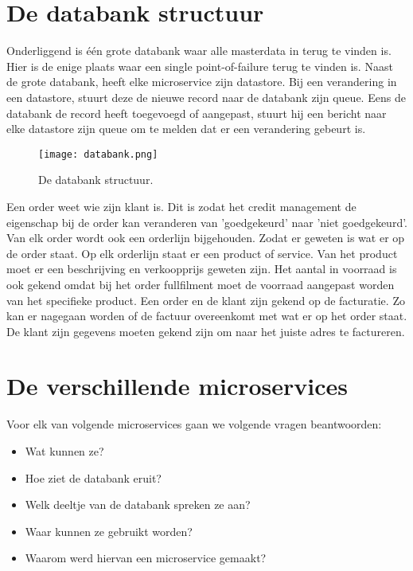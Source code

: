 \section{De databank structuur}
Onderliggend is één grote databank waar alle masterdata in terug te vinden is. Hier is de enige plaats waar een single point-of-failure terug te vinden is. Naast de grote databank, heeft elke microservice zijn datastore. Bij een verandering in een datastore, stuurt deze de nieuwe record naar de databank zijn queue. Eens de databank de record heeft toegevoegd of aangepast, stuurt hij een bericht naar elke datastore zijn queue om te melden dat er een verandering gebeurt is. 
\begin{figure}[h]
	\texttt{[image: databank.png]}
	\caption{De databank structuur.}
	\centering
\end{figure}

Een order weet wie zijn klant is. Dit is zodat het credit management de eigenschap bij de order kan veranderen van 'goedgekeurd' naar 'niet goedgekeurd'. Van elk order wordt ook een orderlijn bijgehouden. Zodat er geweten is wat er op de order staat. Op elk orderlijn staat er een product of service. Van het product moet er een beschrijving en verkoopprijs geweten zijn. Het aantal in voorraad is ook gekend omdat bij het order fullfilment moet de voorraad aangepast worden van het specifieke product. Een order en de klant zijn gekend op de facturatie. Zo kan er nagegaan worden of de factuur overeenkomt met wat er op het order staat. De klant zijn gegevens moeten gekend zijn om naar het juiste adres te factureren.


\section{De verschillende microservices}
Voor elk van volgende microservices gaan we volgende vragen beantwoorden:
\begin{itemize}
	\item Wat kunnen ze?
	\item Hoe ziet de databank eruit?
	\item Welk deeltje van de databank spreken ze aan?
	\item Waar kunnen ze gebruikt worden?
	\item Waarom werd hiervan een microservice gemaakt?
\end{itemize}

